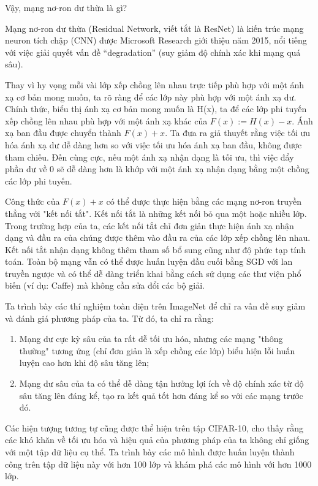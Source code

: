 \documentclass[../main.tex]{subfiles}
\begin{document}
Vậy, mạng nơ-ron dư thừa là gì?

Mạng nơ-ron dư thừa (Residual Network, viết tắt là ResNet) là kiến trúc mạng neuron tích chập (CNN) được Microsoft Research giới thiệu năm 2015, nổi tiếng với việc giải quyết vấn đề ``degradation'' (suy giảm độ chính xác khi mạng quá sâu). 

Thay vì hy vọng mỗi vài lớp xếp chồng lên nhau trực tiếp phù hợp với một ánh xạ cơ bản mong muốn, ta rõ ràng để các lớp này phù hợp với một ánh xạ dư. Chính thức, biểu thị ánh xạ cơ bản mong muốn là H(x), ta để các lớp phi tuyến xếp chồng lên nhau phù hợp với một ánh xạ khác của \(F(x) := H(x)-x\). Ánh xạ ban đầu được chuyển thành \(F(x)+x\). Ta đưa ra giả thuyết rằng việc tối ưu hóa ánh xạ dư dễ dàng hơn so với việc tối ưu hóa ánh xạ ban đầu, không được tham chiếu. Đến cùng cực, nếu một ánh xạ nhận dạng là tối ưu, thì việc đẩy phần dư về 0 sẽ dễ dàng hơn là khớp với một ánh xạ nhận dạng bằng một chồng các lớp phi tuyến.

Công thức của \(F(x)+x\) có thể được thực hiện bằng các mạng nơ-ron truyền thẳng với "kết nối tắt". Kết nối tắt là những kết nối bỏ qua một hoặc nhiều lớp. Trong trường hợp của ta, các kết nối tắt chỉ đơn giản thực hiện ánh xạ nhận dạng và đầu ra của chúng được thêm vào đầu ra của các lớp xếp chồng lên nhau. Kết nối tắt nhận dạng không thêm tham số bổ sung cũng như độ phức tạp tính toán. Toàn bộ mạng vẫn có thể được huấn luyện đầu cuối bằng SGD với lan truyền ngược và có thể dễ dàng triển khai bằng cách sử dụng các thư viện phổ biến (ví dụ: Caffe) mà không cần sửa đổi các bộ giải.

Ta trình bày các thí nghiệm toàn diện trên ImageNet để chỉ ra vấn đề suy giảm và đánh giá phương pháp của ta. Từ đó, ta chỉ ra rằng: 
\begin{enumerate}
    \item Mạng dư cực kỳ sâu của ta rất dễ tối ưu hóa, nhưng các mạng "thông thường" tương ứng (chỉ đơn giản là xếp chồng các lớp) biểu hiện lỗi huấn luyện cao hơn khi độ sâu tăng lên;
    \item Mạng dư sâu của ta có thể dễ dàng tận hưởng lợi ích về độ chính xác từ độ sâu tăng lên đáng kể, tạo ra kết quả tốt hơn đáng kể so với các mạng trước đó.
\end{enumerate}

Các hiện tượng tương tự cũng được thể hiện trên tập CIFAR-10, cho thấy rằng các khó khăn về tối ưu hóa và hiệu quả của phương pháp của ta không chỉ giống với một tập dữ liệu cụ thể. Ta trình bày các mô hình được huấn luyện thành công trên tập dữ liệu này với hơn 100 lớp và khám phá các mô hình với hơn 1000 lớp.
\end{document}
